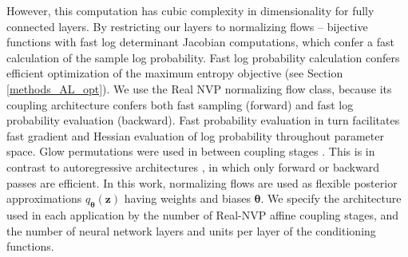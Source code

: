 \documentclass[11pt]{article}
\begin{document}
However, this computation has cubic complexity in dimensionality for fully connected layers.  
By restricting our layers to normalizing flows \cite{rezende2015variational, papamakarios2019normalizing} -- bijective functions with fast log determinant Jacobian computations, which confer a fast calculation of the sample log probability.
Fast log probability calculation confers efficient optimization of the maximum entropy objective (see Section \ref{methods_AL_opt}).
We use the Real NVP \cite{dinh2017density} normalizing flow class, because its coupling architecture confers both fast sampling (forward) and fast log probability evaluation (backward).
Fast probability evaluation in turn facilitates fast gradient and Hessian evaluation of log probability throughout parameter space.
Glow permutations were used in between coupling stages \cite{kingma2018glow}.
This is in contrast to autoregressive architectures \cite{papamakarios2017masked, kingma2016improved}, in which only forward or backward passes are efficient.
In this work, normalizing flows are used as flexible posterior approximations $q_{\bm{\theta}}(\mathbf{z})$ having weights and biases $\bm{\theta}$. 
We specify the architecture used in each application by the number of Real-NVP affine coupling stages, and the number of neural network layers and units per layer of the conditioning functions.
\end{document}
